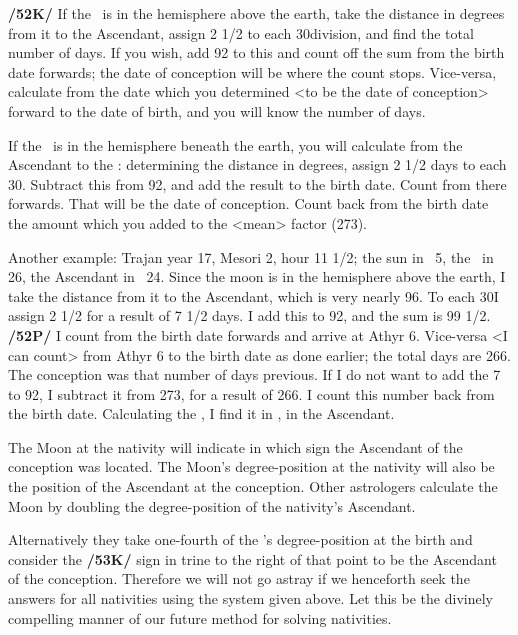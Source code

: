 \textbf{/52K/} If the \Moon\, is in the hemisphere above the earth, take the distance in degrees from it to the
Ascendant, assign 2 1/2 to each 30\deg division, and find the total number of days. If you wish, add 92 to this and count off the sum from the birth date forwards; the date of conception will be where the count stops. Vice-versa, calculate from the date which you determined <to be the date of conception> forward to the date of birth, and you will know the number of days. 

If the \Moon\, is in the hemisphere beneath the earth, you will calculate from the Ascendant to the \Moon: determining the distance in degrees, assign 2 1/2 days to each 30\deg. Subtract this from 92, and add the result to the birth date. Count from there forwards. That will be the date of conception. Count back from the birth date the amount which you added to the <mean> factor (273).

Another example: Trajan year 17, Mesori 2, hour 11 1/2; the sun in \Leo\, 5\deg, the \Moon\, in \Libra\, 26\deg, the Ascendant in \Capricorn\, 24\deg. Since the moon is in the hemisphere above the earth, I take the distance
from it to the Ascendant, which is very nearly 96\deg. To each 30\deg I assign 2 1/2 for a result of 7 1/2 days. I add this to 92, and the sum is 99 1/2. \textbf{/52P/} I count from the birth date forwards and arrive at Athyr 6. Vice-versa <I can count> from Athyr 6 to the birth date as done earlier; the total days are 266. The conception was that number of days previous. If I do not want to add the 7 to 92, I subtract it from 273, for a result of 266. I count this number back from the birth date. Calculating the \Moon, I find it in
\Capricorn, in the Ascendant.

The Moon at the nativity will indicate in which sign the Ascendant of the conception was located. The Moon’s degree-position at the nativity will also be the position of the Ascendant at the conception. Other astrologers calculate the Moon by doubling the degree-position of the nativity’s Ascendant.

Alternatively they take one-fourth of the \Sun’s degree-position at the birth and consider the \textbf{/53K/} sign in
trine to the right of that point to be the Ascendant of the conception. Therefore we will not go astray if we henceforth seek the answers for all nativities using the system given above. Let this be the divinely compelling manner of our future method for solving nativities.

\newpage